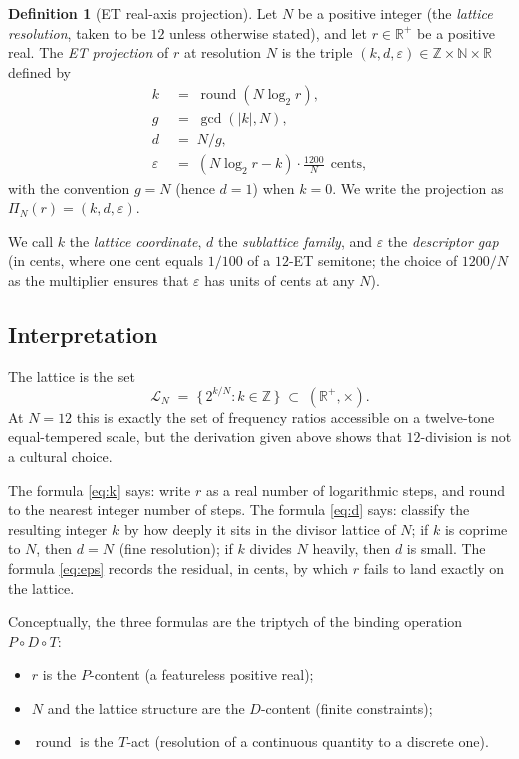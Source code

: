 \documentclass[11pt,a4paper]{article}
\theoremstyle{definition}
\newtheorem{definition}[theorem]{Definition}
\theoremstyle{remark}
\newcommand{\R}{\mathbb{R}}
\newcommand{\Z}{\mathbb{Z}}
\newcommand{\N}{\mathbb{N}}
\DeclareMathOperator{\round}{round}
\newcommand{\eps}{\varepsilon}
\begin{document}
\begin{definition}[ET real-axis projection]\label{def:projection}
Let $N$ be a positive integer (the \emph{lattice resolution}, taken to be $12$ unless otherwise stated), and let $r\in\R^{+}$ be a positive real. The \emph{ET projection} of $r$ at resolution $N$ is the triple $(k,d,\eps)\in\Z\times\N\times\R$ defined by
\begin{align}
k &\;=\; \round(N\log_{2}r),\label{eq:k}\\
g &\;=\; \gcd(|k|,N),\\
d &\;=\; N/g,\label{eq:d}\\
\eps &\;=\; (N\log_{2}r - k)\cdot\frac{1200}{N}\ \ \text{cents},\label{eq:eps}
\end{align}
with the convention $g=N$ (hence $d=1$) when $k=0$. We write the projection as $\Pi_{N}(r) = (k,d,\eps)$.
\end{definition}

We call $k$ the \emph{lattice coordinate}, $d$ the \emph{sublattice family}, and $\eps$ the \emph{descriptor gap} (in cents, where one cent equals $1/100$ of a $12$-ET semitone; the choice of $1200/N$ as the multiplier ensures that $\eps$ has units of cents at any $N$).

\subsection{Interpretation}

The lattice is the set
\[
\mathcal{L}_{N} \;=\; \bigl\{\,2^{k/N} : k\in\Z\,\bigr\} \;\subset\; (\R^{+},\times).
\]
At $N=12$ this is exactly the set of frequency ratios accessible on a twelve-tone equal-tempered scale, but the derivation given above shows that $12$-division is not a cultural choice.

The formula \eqref{eq:k} says: write $r$ as a real number of logarithmic steps, and round to the nearest integer number of steps. The formula \eqref{eq:d} says: classify the resulting integer $k$ by how deeply it sits in the divisor lattice of $N$; if $k$ is coprime to $N$, then $d=N$ (fine resolution); if $k$ divides $N$ heavily, then $d$ is small. The formula \eqref{eq:eps} records the residual, in cents, by which $r$ fails to land exactly on the lattice.

Conceptually, the three formulas are the triptych of the binding operation $P\circ D\circ T$:
\begin{itemize}[leftmargin=*]
\item $r$ is the $P$-content (a featureless positive real);
\item $N$ and the lattice structure are the $D$-content (finite constraints);
\item $\round$ is the $T$-act (resolution of a continuous quantity to a discrete one).
\end{itemize}
\end{document}
